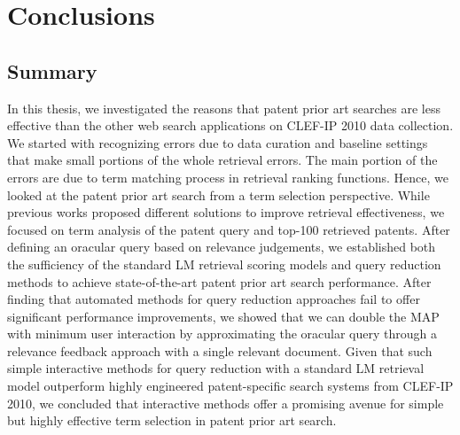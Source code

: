 \chapter{Conclusions}
\label{cha:conc}

\section{Summary}
\label{sec:summary}

In this thesis, we investigated the reasons that patent prior art searches 
are less effective than the other web search applications on CLEF-IP 2010 data collection. 
We started with recognizing errors due to data curation and baseline settings that 
make small portions of the whole retrieval errors. The main portion of the errors are 
due to term matching process in retrieval ranking functions. 
Hence, we looked at the patent prior art search from
a term selection perspective. While previous works proposed
different solutions to improve retrieval effectiveness, we 
focused on term analysis of the patent query and top-100 retrieved patents. 
After defining an oracular query based on
relevance judgements, we established both the sufficiency
of the standard LM retrieval scoring models and query reduction 
methods to achieve state-of-the-art patent prior art
search performance. After finding that automated methods 
for query reduction approaches fail to offer significant
performance improvements, we showed that we can double
the MAP with minimum user interaction by approximating
the oracular query through a relevance feedback approach
with a single relevant document. Given that such simple 
interactive methods for query reduction with a standard LM
retrieval model outperform highly engineered patent-specific
search systems from CLEF-IP 2010, we concluded that interactive 
methods offer a promising avenue for simple but
highly effective term selection in patent prior art search.
 

